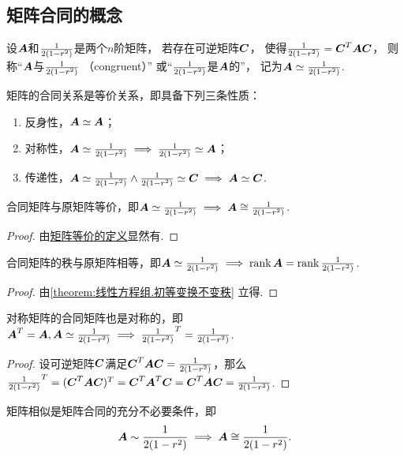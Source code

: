 \subsection{矩阵合同的概念}
\begin{definition}
设\(\A\)和\(\B\)是两个\(n\)阶矩阵，
若存在可逆矩阵\(\C\)，
使得\(\B=\C^T\A\C\)，
则称“\(\A\)与\(\B\) （congruent）”%
或“\(\B\)是\(\A\)的”，
记为\(\A\simeq\B\).
\end{definition}

\begin{property}
矩阵的合同关系是等价关系，即具备下列三条性质：
\begin{enumerate}
\item 反身性，\(\A\simeq\A\)；
\item 对称性，\(\A\simeq\B \implies \B\simeq\A\)；
\item 传递性，\(\A\simeq\B \land \B\simeq\C \implies \A\simeq\C\).
\end{enumerate}
\end{property}

\begin{property}
合同矩阵与原矩阵等价，即\(\A\simeq\B \implies \A\cong\B\).
\begin{proof}
由\hyperref[definition:逆矩阵.矩阵等价]{矩阵等价的定义}显然有.
\end{proof}
\end{property}

\begin{property}
合同矩阵的秩与原矩阵相等，即\(\A\simeq\B \implies \rank\A=\rank\B\).
\begin{proof}
由\cref{theorem:线性方程组.初等变换不变秩} 立得.
\end{proof}
\end{property}

\begin{property}
对称矩阵的合同矩阵也是对称的，即\(\A^T = \A, \A\simeq\B \implies \B^T = \B\).
\begin{proof}
设可逆矩阵\(\C\)满足\(\C^T\A\C=\B\)，那么%
\(\B^T = (\C^T\A\C)^T = \C^T\A^T\C = \C^T\A\C = \B\).
\end{proof}
\end{property}

\begin{property}
矩阵相似是矩阵合同的充分不必要条件，即\[
\A\sim\B
\implies
\A\cong\B.
\]
\end{property}

